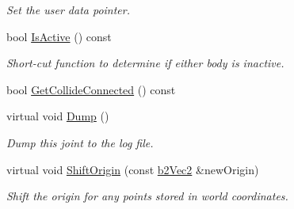 \begin{DoxyCompactItemize}
\begin{DoxyCompactList}\small\item\em Set the user data pointer. \end{DoxyCompactList}\item 
bool \hyperlink{classb2_joint_a825d3a6abb32014f31fd622f2bfc0363}{Is\+Active} () const \hypertarget{classb2_joint_a825d3a6abb32014f31fd622f2bfc0363}{}\label{classb2_joint_a825d3a6abb32014f31fd622f2bfc0363}

\begin{DoxyCompactList}\small\item\em Short-\/cut function to determine if either body is inactive. \end{DoxyCompactList}\item 
bool \hyperlink{classb2_joint_a09c6bdfa5842522ba381bac8dd559f4d}{Get\+Collide\+Connected} () const 
\item 
virtual void \hyperlink{classb2_joint_abd35e7316017ad9a40d5dbf9b5ba3f36}{Dump} ()\hypertarget{classb2_joint_abd35e7316017ad9a40d5dbf9b5ba3f36}{}\label{classb2_joint_abd35e7316017ad9a40d5dbf9b5ba3f36}

\begin{DoxyCompactList}\small\item\em Dump this joint to the log file. \end{DoxyCompactList}\item 
virtual void \hyperlink{classb2_joint_a7804f649e993dc0fd9ae47fde5601f90}{Shift\+Origin} (const \hyperlink{structb2_vec2}{b2\+Vec2} \&new\+Origin)\hypertarget{classb2_joint_a7804f649e993dc0fd9ae47fde5601f90}{}\label{classb2_joint_a7804f649e993dc0fd9ae47fde5601f90}

\begin{DoxyCompactList}\small\item\em Shift the origin for any points stored in world coordinates. \end{DoxyCompactList}\end{DoxyCompactItemize}
